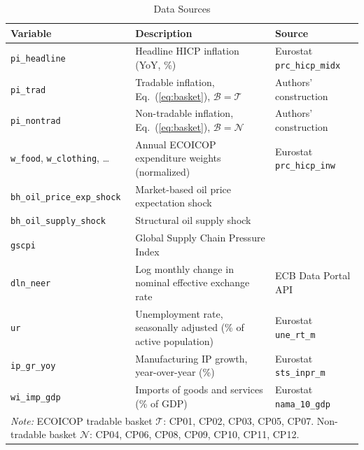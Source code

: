 \begin{table}[htbp]
  \centering
  \caption{Data Sources}
  \label{tab:sources}
  \begin{tabular}{llp{5cm}}
    \toprule
    Variable & Description & Source \\
    \midrule
    \texttt{pi\_headline} & Headline HICP inflation (YoY, \%) & Eurostat \texttt{prc\_hicp\_midx} \\
    \texttt{pi\_trad} & Tradable inflation, Eq.~(\ref{eq:basket}), $\mathcal{B}=\mathcal{T}$ & Authors' construction \\
    \texttt{pi\_nontrad} & Non-tradable inflation, Eq.~(\ref{eq:basket}), $\mathcal{B}=\mathcal{N}$ & Authors' construction \\
    \texttt{w\_food}, \texttt{w\_clothing}, \ldots & Annual ECOICOP expenditure weights (normalized) & Eurostat \texttt{prc\_hicp\_inw} \\
    \texttt{bh\_oil\_price\_exp\_shock} & Market-based oil price expectation shock & \citet{baumeister2019} \\
    \texttt{bh\_oil\_supply\_shock} & Structural oil supply shock & \citet{baumeister2019} \\
    \texttt{gscpi} & Global Supply Chain Pressure Index & \citet{benigno2022} \\
    \texttt{dln\_neer} & Log monthly change in nominal effective exchange rate & ECB Data Portal API \\
    \texttt{ur} & Unemployment rate, seasonally adjusted (\% of active population) & Eurostat \texttt{une\_rt\_m} \\
    \texttt{ip\_gr\_yoy} & Manufacturing IP growth, year-over-year (\%) & Eurostat \texttt{sts\_inpr\_m} \\
    \texttt{wi\_imp\_gdp} & Imports of goods and services (\% of GDP) & Eurostat \texttt{nama\_10\_gdp} \\
    \midrule
    \multicolumn{3}{l}{\footnotesize\textit{Note:} ECOICOP tradable basket $\mathcal{T}$: CP01, CP02, CP03, CP05, CP07. Non-tradable basket $\mathcal{N}$: CP04, CP06, CP08, CP09, CP10, CP11, CP12.}
    \bottomrule
  \end{tabular}
\end{table}
